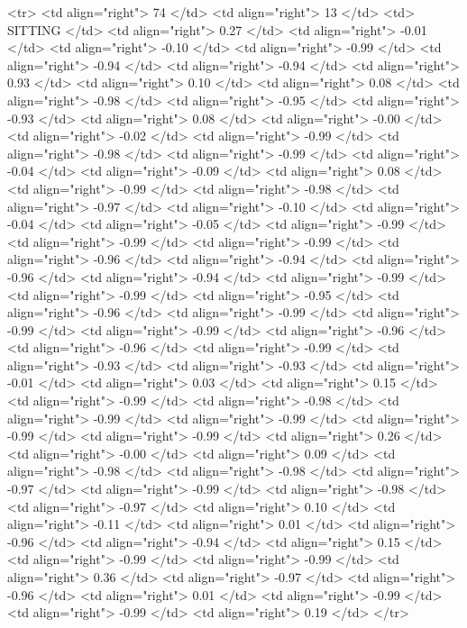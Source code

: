   <tr> <td align="right"> 74 </td> <td align="right">  13 </td> <td> SITTING </td> <td align="right"> 0.27 </td> <td align="right"> -0.01 </td> <td align="right"> -0.10 </td> <td align="right"> -0.99 </td> <td align="right"> -0.94 </td> <td align="right"> -0.94 </td> <td align="right"> 0.93 </td> <td align="right"> 0.10 </td> <td align="right"> 0.08 </td> <td align="right"> -0.98 </td> <td align="right"> -0.95 </td> <td align="right"> -0.93 </td> <td align="right"> 0.08 </td> <td align="right"> -0.00 </td> <td align="right"> -0.02 </td> <td align="right"> -0.99 </td> <td align="right"> -0.98 </td> <td align="right"> -0.99 </td> <td align="right"> -0.04 </td> <td align="right"> -0.09 </td> <td align="right"> 0.08 </td> <td align="right"> -0.99 </td> <td align="right"> -0.98 </td> <td align="right"> -0.97 </td> <td align="right"> -0.10 </td> <td align="right"> -0.04 </td> <td align="right"> -0.05 </td> <td align="right"> -0.99 </td> <td align="right"> -0.99 </td> <td align="right"> -0.99 </td> <td align="right"> -0.96 </td> <td align="right"> -0.94 </td> <td align="right"> -0.96 </td> <td align="right"> -0.94 </td> <td align="right"> -0.99 </td> <td align="right"> -0.99 </td> <td align="right"> -0.95 </td> <td align="right"> -0.96 </td> <td align="right"> -0.99 </td> <td align="right"> -0.99 </td> <td align="right"> -0.99 </td> <td align="right"> -0.96 </td> <td align="right"> -0.96 </td> <td align="right"> -0.99 </td> <td align="right"> -0.93 </td> <td align="right"> -0.93 </td> <td align="right"> -0.01 </td> <td align="right"> 0.03 </td> <td align="right"> 0.15 </td> <td align="right"> -0.99 </td> <td align="right"> -0.98 </td> <td align="right"> -0.99 </td> <td align="right"> -0.99 </td> <td align="right"> -0.99 </td> <td align="right"> -0.99 </td> <td align="right"> 0.26 </td> <td align="right"> -0.00 </td> <td align="right"> 0.09 </td> <td align="right"> -0.98 </td> <td align="right"> -0.98 </td> <td align="right"> -0.97 </td> <td align="right"> -0.99 </td> <td align="right"> -0.98 </td> <td align="right"> -0.97 </td> <td align="right"> 0.10 </td> <td align="right"> -0.11 </td> <td align="right"> 0.01 </td> <td align="right"> -0.96 </td> <td align="right"> -0.94 </td> <td align="right"> 0.15 </td> <td align="right"> -0.99 </td> <td align="right"> -0.99 </td> <td align="right"> 0.36 </td> <td align="right"> -0.97 </td> <td align="right"> -0.96 </td> <td align="right"> 0.01 </td> <td align="right"> -0.99 </td> <td align="right"> -0.99 </td> <td align="right"> 0.19 </td> </tr>
